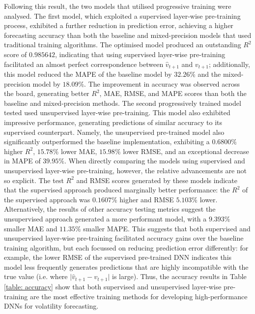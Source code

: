 \documentclass[a4paper, 11pt]{report}
\begin{document}
    Following this result, the two models that utilised progressive training were analysed. The first model, which exploited a supervised layer-wise pre-training process, exhibited a further reduction in prediction error, achieving a higher forecasting accuracy than both the baseline and mixed-precision models that used traditional training algorithms. The optimised model produced an outstanding $R^2$ score of $0.985642$, indicating that using supervised layer-wise pre-training facilitated an almost perfect correspondence between $\hat{v}_{t+1}$ and $v_{t+1}$; additionally, this model reduced the MAPE of the baseline model by $32.26\%$ and the mixed-precision model by $18.09\%$. The improvement in accuracy was observed across the board, generating better $R^2$, MAE, RMSE, and MAPE scores than both the baseline and mixed-precision methods. The second progressively trained model tested used unsupervised layer-wise pre-training. This model also exhibited impressive performance, generating predictions of similar accuracy to its supervised counterpart. Namely, the unsupervised pre-trained model also significantly outperformed the baseline implementation, exhibiting a $0.6800\%$ higher $R^2$, $15.78\%$ lower MAE, $15.98\%$ lower RMSE, and an exceptional decrease in MAPE of $39.95\%$. When directly comparing the models using supervised and unsupervised layer-wise pre-training, however, the relative advancements are not so explicit. The test $R^2$ and RMSE scores generated by these models indicate that the supervised approach produced marginally better performance: the $R^2$ of the supervised approach was $0.1607\%$ higher and RMSE $5.103\%$ lower. Alternatively, the results of other accuracy testing metrics suggest the unsupervised approach generated a more performant model, with a $9.393\%$ smaller MAE and $11.35\%$ smaller MAPE. This suggests that both supervised and unsupervised layer-wise pre-training facilitated accuracy gains over the baseline training algorithm, but each focussed on reducing prediction error differently: for example, the lower RMSE of the supervised pre-trained DNN indicates this model less frequently generates predictions that are highly incompatible with the true value (i.e. where $\lvert \hat{v}_{t+1} - v_{t+1} \lvert$ is large). Thus, the accuracy results in Table \ref{table: accuracy} show that both supervised and unsupervised layer-wise pre-training are the most effective training methods for developing high-performance DNNs for volatility forecasting. 
\end{document}

